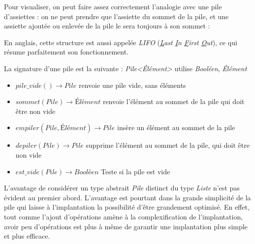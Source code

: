 \documentclass[../../../main.tex]{subfiles}
\begin{document}
Pour visualiser, on peut faire assez correctement l'analogie avec une pile d'assiettes : on ne peut prendre que l'assiette du sommet de la pile, et une assiette ajoutée ou enlevée de la pile le sera toujours à son sommet :

\begin{minipage}{\textwidth}
	\begin{center}
		
	\end{center}
\end{minipage}

En anglais, cette structure est aussi appelée \textit{LIFO} (\textit{\underline{L}ast \underline{I}n \underline{F}irst \underline{O}ut}), ce qui résume parfaitement son fonctionnement.

La signature d'une pile est la suivante :
\textit{Pile\textless Élément\textgreater} utilise \textit{Booléen}, \textit{Élément}
\begin{itemize}
	\item $pile\_vide()\rightarrow Pile$ renvoie une pile vide, sans éléments
	\item $sommet(Pile)\rightarrow \textit{Élément}$ renvoie l'élément au sommet de la pile qui doit être non vide
	\item $empiler(Pile, \textit{Élément}) \rightarrow Pile$ insère un élément au sommet de la pile
	\item $depiler(Pile)\rightarrow Pile$ supprime l'élément au sommet de la pile, qui doit être non vide
	\item $est\_vide(Pile)\rightarrow \textit{Booléen}$ Teste si la pile est vide
\end{itemize}

L'avantage de considérer un type abstrait \textit{Pile} distinct du type \textit{Liste} n'est pas évident au premier abord. L'avantage est pourtant dans la grande simplicité de la pile qui laisse à l'implantation la possibilité d'être grandement optimisé. En effet, tout comme l'ajout d'opérations amène à la complexification de l'implantation, avoir peu d'opérations est plus à même de garantir une implantation plus simple et plus efficace.
\end{document}
